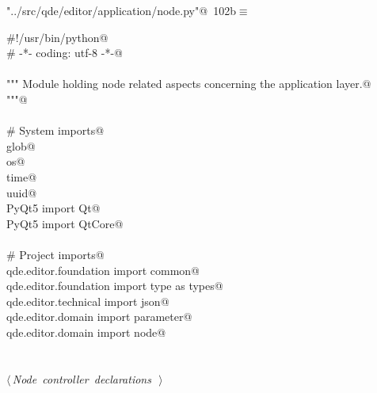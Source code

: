 \documentclass[
    a4paper,      %
    10pt,         %
    openright,    %
    notitlepage,  %
    parskip=half, %
]{scrreprt}       %
\theoremstyle{definition}                    %
\begin{document}
\begin{flushleft} \small
\begin{minipage}{\linewidth}\label{scrap165}\raggedright\small
{} \verb@"../src/qde/editor/application/node.py"@\nobreak\ {\footnotesize {102b}}$\equiv$
\vspace{-1ex}
\begin{list}{}{} \item
\mbox{}\lstinline@#!/usr/bin/python@\\
\mbox{}\lstinline@# -*- coding: utf-8 -*-@\\
\mbox{}\lstinline@@\\
\mbox{}\lstinline@""" Module holding node related aspects concerning the application layer.@\\
\mbox{}\lstinline@"""@\\
\mbox{}\lstinline@@\\
\mbox{}\lstinline@# System imports@\\
\mbox{}\lstinline@import glob@\\
\mbox{}\lstinline@import os@\\
\mbox{}\lstinline@import time@\\
\mbox{}\lstinline@import uuid@\\
\mbox{}\lstinline@from PyQt5 import Qt@\\
\mbox{}\lstinline@from PyQt5 import QtCore@\\
\mbox{}\lstinline@@\\
\mbox{}\lstinline@# Project imports@\\
\mbox{}\lstinline@from qde.editor.foundation import common@\\
\mbox{}\lstinline@from qde.editor.foundation import type as types@\\
\mbox{}\lstinline@from qde.editor.technical import json@\\
\mbox{}\lstinline@from qde.editor.domain import parameter@\\
\mbox{}\lstinline@from qde.editor.domain import node@\\
\mbox{}\lstinline@@\\
\mbox{}\lstinline@@\\
\mbox{}\lstinline@@\hbox{$\langle\,${\itshape Node controller declarations}\nobreak\ {\footnotesize {}}$\,\rangle$}\lstinline@@\\
\mbox{}\lstinline@@{\NWsep}
\end{list}
\vspace{-1.5ex}
\footnotesize
\begin{list}{}{\setlength{\itemsep}{-\parsep}\setlength{\itemindent}{-\leftmargin}}

\item{}
\end{list}
\end{minipage}\vspace{4ex}
\end{flushleft}
\end{document}
